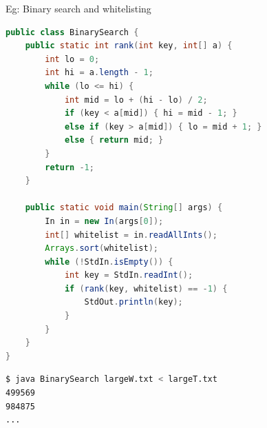 \documentclass[8pt,a4paper,compress]{beamer}
\begin{document}
\begin{frame}[fragile]
\pause

Eg: Binary search and whitelisting

\begin{lstlisting}[language=Java]
public class BinarySearch {
    public static int rank(int key, int[] a) {
        int lo = 0;
        int hi = a.length - 1;
        while (lo <= hi) {
            int mid = lo + (hi - lo) / 2;
            if (key < a[mid]) { hi = mid - 1; }
            else if (key > a[mid]) { lo = mid + 1; }
            else { return mid; }
        }
        return -1;
    }

    public static void main(String[] args) {
        In in = new In(args[0]);
        int[] whitelist = in.readAllInts();
        Arrays.sort(whitelist);
        while (!StdIn.isEmpty()) {
            int key = StdIn.readInt();
            if (rank(key, whitelist) == -1) {
                StdOut.println(key);
            }
        }
    }
}
\end{lstlisting}

\begin{lstlisting}[language=bash]
$ java BinarySearch largeW.txt < largeT.txt
499569
984875
...
\end{lstlisting}

\end{frame}
\end{document}
